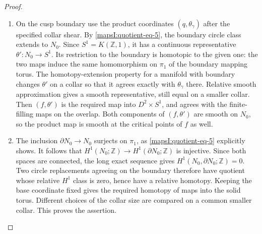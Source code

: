\begin{proof}
\begin{enumerate}[label=\arabic*.,leftmargin=*]
\item On the cusp boundary use the product coordinates
$(q,\theta_\gamma)$ after the specified collar shear.
By \eqref{mapsI:quotient-eq-5}, the boundary circle class extends to $N_0$.
Since $S^1=K(\mathbb Z,1)$, it has a continuous representative
$\theta':N_0\to S^1$.  Its restriction to the boundary is
homotopic to the given one: the two maps induce the same
homomorphism on $\pi_1$ of the boundary mapping torus.
The homotopy-extension property for a manifold with boundary
changes $\theta'$ on a collar so that it agrees exactly with
$\theta_\gamma$ there.  Relative smooth approximation gives
a smooth representative, still equal on a smaller collar.
Then $(f,\theta')$ is the required map into $D^2\times S^1$,
and agrees with the finite-filling maps on the overlap.
Both components of $(f,\theta')$ are smooth on $N_0$, so the
product map is smooth at the critical points of $f$ as well.

\item The inclusion $\partial N_0\to N_0$ surjects on $\pi_1$,
as \eqref{mapsI:quotient-eq-5} explicitly shows.  It follows that
$H^1(N_0;\mathbb Z)\to H^1(\partial N_0;\mathbb Z)$
is injective.  Since both spaces are connected, the long
exact sequence gives $H^1(N_0,\partial N_0;\mathbb Z)=0$.
Two circle replacements agreeing on the boundary therefore
have quotient whose relative $H^1$ class is zero, hence
have a relative homotopy.  Keeping the base coordinate
fixed gives the required homotopy of maps into the solid
torus.  Different choices of the collar size are compared
on a common smaller collar.  This proves the assertion.
\end{enumerate}
\end{proof}
